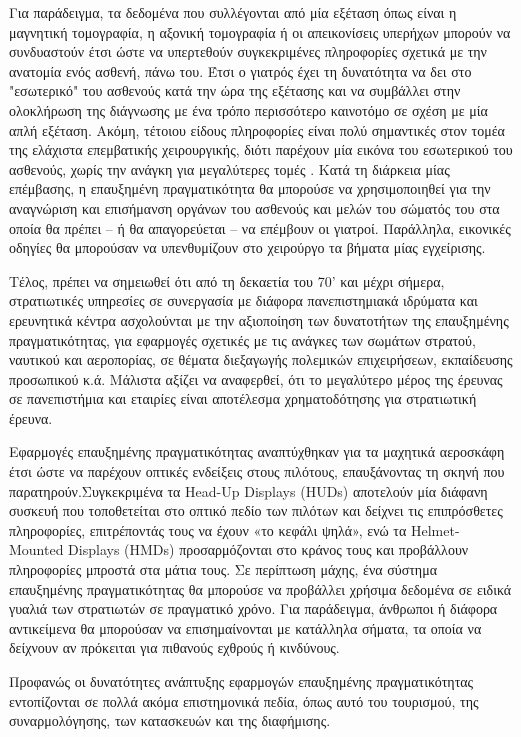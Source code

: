 Για παράδειγμα, τα δεδομένα που συλλέγονται από μία εξέταση όπως είναι η μαγνητική τομογραφία, η αξονική τομογραφία ή οι απεικονίσεις υπερήχων μπορούν να συνδυαστούν έτσι ώστε να υπερτεθούν συγκεκριμένες πληροφορίες σχετικά με την ανατομία ενός ασθενή, πάνω του. Έτσι ο γιατρός έχει τη δυνατότητα να δει στο "εσωτερικό" του ασθενούς κατά την ώρα της εξέτασης και να συμβάλλει στην ολοκλήρωση της διάγνωσης με ένα τρόπο περισσότερο καινοτόμο σε σχέση με μία απλή εξέταση. Ακόμη, τέτοιου είδους πληροφορίες είναι πολύ σημαντικές στον τομέα της ελάχιστα επεμβατικής χειρουργικής, διότι παρέχουν μία εικόνα του εσωτερικού του ασθενούς, χωρίς την ανάγκη για μεγαλύτερες τομές \cite{fuchs1998augmented}. Κατά τη διάρκεια μίας επέμβασης, η επαυξημένη πραγματικότητα θα μπορούσε να χρησιμοποιηθεί για την αναγνώριση και επισήμανση οργάνων του ασθενούς και μελών του σώματός του στα οποία θα πρέπει – ή θα απαγορεύεται – να επέμβουν οι γιατροί. Παράλληλα, εικονικές οδηγίες θα μπορούσαν να υπενθυμίζουν στο χειρούργο τα βήματα μίας εγχείρισης.




Τέλος, πρέπει να σημειωθεί ότι από τη δεκαετία του 70' και μέχρι σήμερα, στρατιωτικές υπηρεσίες σε συνεργασία με διάφορα πανεπιστημιακά ιδρύματα και ερευνητικά κέντρα ασχολούνται με την αξιοποίηση των δυνατοτήτων της επαυξημένης πραγματικότητας, για εφαρμογές σχετικές με τις ανάγκες των σωμάτων στρατού, ναυτικού και αεροπορίας, σε θέματα διεξαγωγής πολεμικών επιχειρήσεων, εκπαίδευσης προσωπικού κ.ά. Μάλιστα αξίζει να αναφερθεί, ότι το μεγαλύτερο μέρος της έρευνας σε πανεπιστήμια και εταιρίες είναι αποτέλεσμα χρηματοδότησης για στρατιωτική έρευνα.


Εφαρμογές επαυξημένης πραγματικότητας αναπτύχθηκαν για τα μαχητικά αεροσκάφη έτσι ώστε να παρέχουν οπτικές ενδείξεις στους πιλότους, επαυξάνοντας τη σκηνή που παρατηρούν.Συγκεκριμένα τα Head-Up Displays (HUDs) αποτελούν μία διάφανη συσκευή που τοποθετείται στο οπτικό πεδίο των πιλότων και δείχνει τις επιπρόσθετες πληροφορίες, επιτρέποντάς τους να έχουν «το κεφάλι ψηλά», ενώ τα Helmet-Mounted Displays (HMDs) προσαρμόζονται στο κράνος τους και προβάλλουν πληροφορίες μπροστά στα μάτια τους. Σε περίπτωση μάχης, ένα σύστημα επαυξημένης πραγματικότητας θα μπορούσε να προβάλλει χρήσιμα δεδομένα σε ειδικά γυαλιά των στρατιωτών σε πραγματικό χρόνο. Για παράδειγμα, άνθρωποι ή διάφορα αντικείμενα θα μπορούσαν να επισημαίνονται με κατάλληλα σήματα, τα οποία να δείχνουν αν πρόκειται για πιθανούς εχθρούς ή κινδύνους. 


Προφανώς οι δυνατότητες ανάπτυξης εφαρμογών επαυξημένης πραγματικότητας εντοπίζονται σε πολλά ακόμα επιστημονικά πεδία, όπως αυτό του τουρισμού, της συναρμολόγησης, των κατασκευών και της διαφήμισης.



